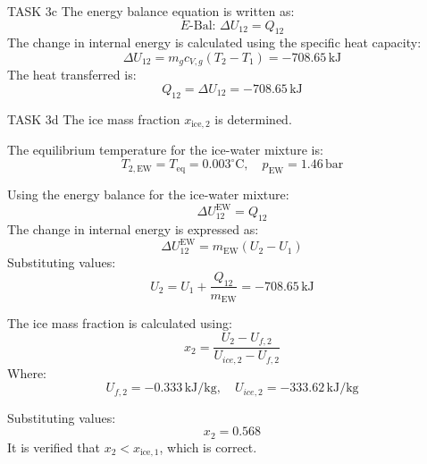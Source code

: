 TASK 3c  
The energy balance equation is written as:  
\[
E\text{-Bal: } \Delta U_{12} = Q_{12}
\]  
The change in internal energy is calculated using the specific heat capacity:  
\[
\Delta U_{12} = m_g c_{V,g} (T_2 - T_1) = -708.65 \, \text{kJ}
\]  
The heat transferred is:  
\[
Q_{12} = \Delta U_{12} = -708.65 \, \text{kJ}
\]  

TASK 3d  
The ice mass fraction \( x_{\text{ice},2} \) is determined.  

The equilibrium temperature for the ice-water mixture is:  
\[
T_{2,\text{EW}} = T_{\text{eq}} = 0.003^\circ \text{C}, \quad p_{\text{EW}} = 1.46 \, \text{bar}
\]  

Using the energy balance for the ice-water mixture:  
\[
\Delta U_{12}^{\text{EW}} = Q_{12}
\]  
The change in internal energy is expressed as:  
\[
\Delta U_{12}^{\text{EW}} = m_{\text{EW}} (U_2 - U_1)
\]  
Substituting values:  
\[
U_2 = U_1 + \frac{Q_{12}}{m_{\text{EW}}} = -708.65 \, \text{kJ}
\]  

The ice mass fraction is calculated using:  
\[
x_2 = \frac{U_2 - U_{f,2}}{U_{ice,2} - U_{f,2}}
\]  
Where:  
\[
U_{f,2} = -0.333 \, \text{kJ/kg}, \quad U_{ice,2} = -333.62 \, \text{kJ/kg}
\]  

Substituting values:  
\[
x_2 = 0.568
\]  
It is verified that \( x_2 < x_{\text{ice},1} \), which is correct.